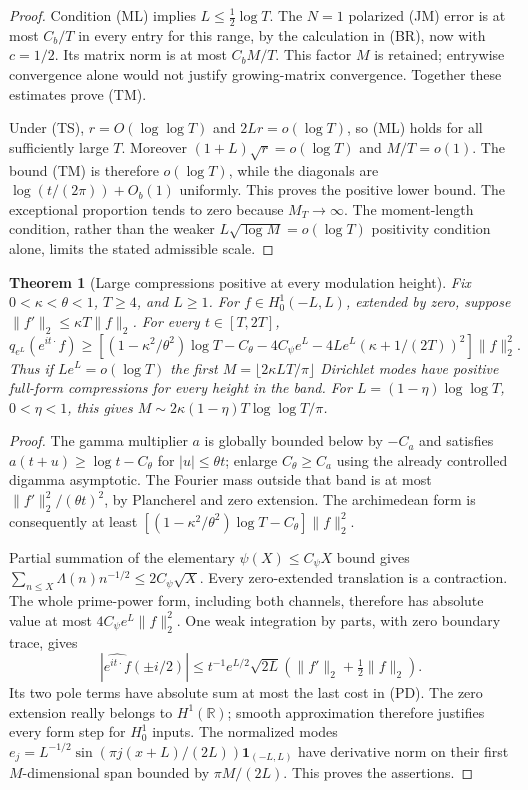 \documentclass[11pt]{article}
\newtheorem{theorem}{Theorem}
\theoremstyle{remark}\newtheorem{remark}[theorem]{Remark}
\newcommand{\R}{\mathbb R}
\begin{document}
\begin{proof}
Condition (ML) implies $L\le\frac12\log T$.
The $N=1$ polarized (JM) error is at most $C_b/T$ in
every entry for this range, by the calculation in (BR), now
with $c=1/2$. Its matrix norm is at most $C_bM/T$.
This factor $M$ is retained; entrywise convergence alone
would not justify growing-matrix convergence.
Together these estimates prove (TM).

Under (TS), $r=O(\log\log T)$ and $2Lr=o(\log T)$,
so (ML) holds for all sufficiently large $T$.
Moreover $(1+L)\sqrt r=o(\log T)$ and $M/T=o(1)$.
The bound (TM) is therefore $o(\log T)$, while the
diagonals are $\log(t/(2\pi))+O_b(1)$ uniformly.
This proves the positive lower bound. The exceptional
proportion tends to zero because $M_T\to\infty$.
The moment-length condition, rather than the weaker
$L\sqrt{\log M}=o(\log T)$ positivity condition alone,
limits the stated admissible scale.
\end{proof}

\begin{theorem}[Large compressions positive at every modulation height]
\label{thm:pointwise-dirichlet}
Fix $0<\kappa<\theta<1$, $T\ge4$, and $L\ge1$.
For $f\in H_0^1(-L,L)$, extended by zero, suppose
$\|f'\|_2\le\kappa T\|f\|_2$. For every $t\in[T,2T]$,
\[
 q_{e^L}(e^{it\cdot}f)\ge
 \left[(1-\kappa^2/\theta^2)\log T-C_\theta-4C_\psi e^L
           -4Le^L(\kappa+1/(2T))^2\right]\|f\|_2^2.     \tag{PD}
\]
Thus if $Le^L=o(\log T)$ the first
$M=\lfloor2\kappa LT/\pi\rfloor$ Dirichlet modes have positive
full-form compressions for every height in the band.
For $L=(1-\eta)\log\log T$, $0<\eta<1$, this gives
$M\sim2\kappa(1-\eta)T\log\log T/\pi$.
\end{theorem}
\begin{proof}
The gamma multiplier $a$ is globally bounded below by $-C_a$
and satisfies $a(t+u)\ge\log t-C_\theta$ for $|u|\le\theta t$;
enlarge $C_\theta\ge C_a$ using the already controlled digamma
asymptotic. The Fourier mass outside that band is at most
$\|f'\|_2^2/(\theta t)^2$, by Plancherel and zero extension.
The archimedean form is consequently at least
$[(1-\kappa^2/\theta^2)\log T-C_\theta]\|f\|_2^2$.

Partial summation of the elementary $\psi(X)\le C_\psi X$ bound gives
$\sum_{n\le X}\Lambda(n)n^{-1/2}\le2C_\psi\sqrt X$.
Every zero-extended translation is a contraction. The whole
prime-power form, including both channels, therefore has absolute
value at most $4C_\psi e^L\|f\|_2^2$.
One weak integration by parts, with zero boundary trace, gives
\[
 |\widehat{e^{it\cdot}f}(\pm i/2)|
 \le t^{-1}e^{L/2}\sqrt{2L}
                         (\|f'\|_2+\tfrac12\|f\|_2).
\]
Its two pole terms have absolute sum at most the last cost in (PD).
The zero extension really belongs to $H^1(\R)$; smooth approximation
therefore justifies every form step for $H_0^1$ inputs.
The normalized modes
$e_j=L^{-1/2}\sin(\pi j(x+L)/(2L))\mathbf1_{(-L,L)}$
have derivative norm on their first $M$-dimensional span bounded by
$\pi M/(2L)$. This proves the assertions.
\end{proof}
\end{document}
